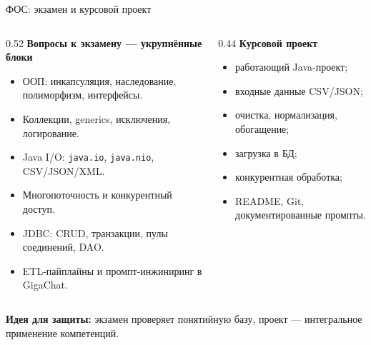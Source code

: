 \documentclass[aspectratio=169,10pt]{beamer}
\newcommand{\smallgap}{\vspace{0.35em}}
\begin{document}
\begin{frame}{ФОС: экзамен и курсовой проект}
\small
\begin{columns}[T,onlytextwidth]
\begin{column}{0.52\textwidth}
\textbf{Вопросы к экзамену — укрупнённые блоки}
\begin{itemize}
  \item ООП: инкапсуляция, наследование, полиморфизм, интерфейсы.
  \item Коллекции, generics, исключения, логирование.
  \item Java I/O: \texttt{java.io}, \texttt{java.nio}, CSV/JSON/XML.
  \item Многопоточность и конкурентный доступ.
  \item JDBC: CRUD, транзакции, пулы соединений, DAO.
  \item ETL-пайплайны и промпт-инжиниринг в GigaChat.
\end{itemize}
\end{column}
\begin{column}{0.44\textwidth}
\textbf{Курсовой проект}
\begin{itemize}
  \item работающий Java-проект;
  \item входные данные CSV/JSON;
  \item очистка, нормализация, обогащение;
  \item загрузка в БД;
  \item конкурентная обработка;
  \item README, Git, документированные промпты.
\end{itemize}
\end{column}
\end{columns}
\smallgap
\textbf{Идея для защиты:} экзамен проверяет понятийную базу, проект — интегральное применение компетенций.
\end{frame}
\end{document}

